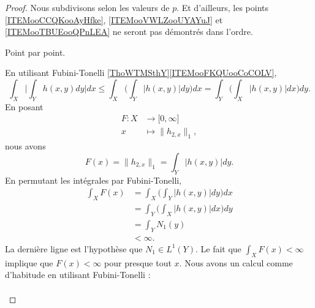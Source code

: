 \begin{proof}
	Nous subdivisons selon les valeurs de \( p\). Et d'ailleurs, les points \ref{ITEMooCCQKooAyHfke}, \ref{ITEMooVWLZooUYAYuJ} et \ref{ITEMooTBUEooQPnLEA} ne seront pas démontrés dans l'ordre.
	\begin{subproof}
		\spitem[Pour \( p=1\)]
		Point par point.
		\begin{subproof}
			En utilisant Fubini-Tonelli \ref{ThoWTMSthY}\ref{ITEMooFKQUooCoCOLV},
			\begin{equation}
				\int_X\Big|\int_Yh(x,y)dy\Big|dx\leq \int_X\Big( \int_Y| h(x,y) |dy \Big)dx=\int_Y\big( \int_X| h(x,y) |dx \big)dy.
			\end{equation}
			En posant
			\begin{equation}
				\begin{aligned}
					F\colon X & \to \mathopen[ 0,\infty\mathclose] \\
					x         & \mapsto \| h_{2,x} \|_1,
				\end{aligned}
			\end{equation}
			nous avons
			\begin{equation}
				F(x)=\| h_{2,x} \|_1=\int_Y| h(x,y) |dy.
			\end{equation}
			En permutant les intégrales par Fubini-Tonelli,
			\begin{subequations}
				\begin{align}
					\int_XF(x) & =\int_X\Big( \int_Y| h(x,y) |dy \Big)dx \\
					           & =\int_Y\Big( \int_X| h(x,y) |dx \Big)dy \\
					           & =\int_YN_1(y)                           \\
					           & <\infty.
				\end{align}
			\end{subequations}
			La dernière ligne est l'hypothèse que \( N_1\in L^1(Y)\). Le fait que \( \int_XF(x)<\infty\) implique que \( F(x)<\infty\) pour presque tout \( x\).
			Nous avons un calcul comme d'habitude en utilisant Fubini-Tonelli :
			\begin{subequations}
				\begin{align}

\end{align}
\end{subequations}
\end{subproof}
\end{subproof}
\end{proof}
